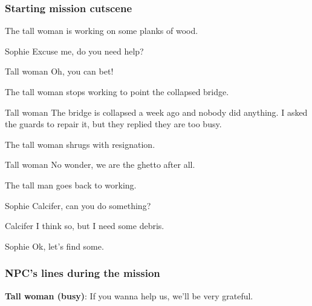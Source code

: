 \subsubsection*{Starting mission cutscene}
\begin{screenplay}

The tall woman is working on some planks of wood.

\begin{dialogue}{Sophie}
Excuse me, do you need help?
\end{dialogue}

\begin{dialogue}{Tall woman}
Oh, you can bet!
\end{dialogue}

The tall woman stops working to point the collapsed bridge.

\begin{dialogue}[continuing]{Tall woman}
The bridge is collapsed a week ago and nobody did anything. I asked the guards to repair it, but they replied they are too busy.
\end{dialogue}

The tall woman shrugs with resignation.

\begin{dialogue}[continuing]{Tall woman}
No wonder, we are the ghetto after all.
\end{dialogue}

The tall man goes back to working.

\begin{dialogue}{Sophie}
Calcifer, can you do something?
\end{dialogue}

\begin{dialogue}{Calcifer}
I think so, but I need some debris.
\end{dialogue}

\begin{dialogue}{Sophie}
Ok, let's find some.
\end{dialogue}

\end{screenplay}

\subsubsection*{NPC's lines during the mission}
\textbf{Tall woman (busy)}: If you wanna help us, we'll be very grateful.

